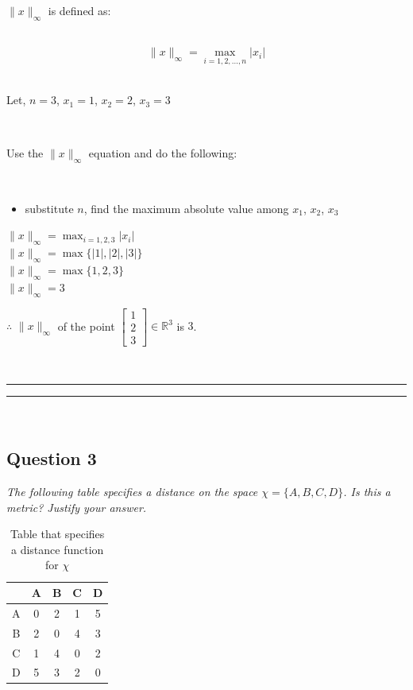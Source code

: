 \documentclass{article}
\begin{document}
\parbox{\textwidth}{$\|x\|_{\infty}$ is defined as:}\\

$$\|x\|_{\infty} = \max_{i=1,2,...,n} |x_i|$$\\

\parbox{\textwidth}{Let, $n=3$, $x_1 = 1$, $x_2 = 2$, $x_3 = 3$}\\

\parbox{\textwidth}{Use the $\|x\|_{\infty}$ equation and do the following:}\\

\begin{itemize}
    \item {substitute $n$, find the maximum absolute value among $x_1$, $x_2$, $x_3$}
\end{itemize}

$\|x\|_{\infty} = \max_{i=1,2,3} |x_i|$\\

$\|x\|_{\infty} = \max\{|1|, |2|, |3|\}$\\

$\|x\|_{\infty} = \max\{1, 2, 3\}$\\

$\|x\|_{\infty} = 3$\\

\parbox{\textwidth}{$\therefore$ $\|x\|_{\infty}$ of the point $\begin{bmatrix} 1 \\ 2 \\ 3 \end{bmatrix} \in \mathbb{R}^3$ is $3$.}\\

\noindent\rule{\textwidth}{0.4pt}
\noindent\rule{\textwidth}{0.4pt}\\

\newpage

\subsection*{Question 3}
\textit{The following table specifies a distance on the space $\chi = \{A, B, C, D\}$. Is this a metric? Justify your answer.}\\

\begin{table}[h]
\centering
\begin{tabular}{c|cccc}
  & A & B & C & D \\ \hline
A & 0 & 2 & 1 & 5 \\
B & 2 & 0 & 4 & 3 \\
C & 1 & 4 & 0 & 2 \\
D & 5 & 3 & 2 & 0 \\
\end{tabular}
\caption{Table that specifies a distance function for $\chi$}
\label{tab:example}
\end{table}
\end{document}
